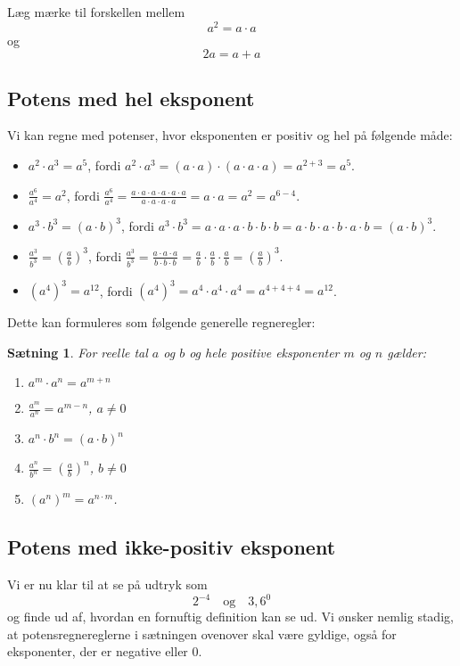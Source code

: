 \documentclass[12pt,oneside,a4paper]{article}
\theoremstyle{plain}
\newtheorem*{thm}{Sætning}
\begin{document}
Læg mærke til forskellen mellem
$$
a^2 = a \cdot a
$$
og
$$
2a = a + a
$$

\subsection*{Potens med hel eksponent}
Vi kan regne med potenser, hvor eksponenten er positiv og hel på følgende måde:
\begin{itemize}
    \item $a^2 \cdot a^3 = a^5$, fordi $a^2\cdot a^3 = (a\cdot a)\cdot (a \cdot
        a\cdot a) = a^{2+3} = a^5$.
    \item $\frac{a^6}{a^4} = a^2$, fordi $\frac{a^6}{a^4} = \frac{a \cdot a
        \cdot a\cdot a\cdot a\cdot a}{a\cdot a\cdot a\cdot a} = a\cdot a = a^2
        = a^{6-4}$.
    \item $a^3\cdot b^3 = (a\cdot b)^3$, fordi $a^3 \cdot b^3 = a\cdot a\cdot
        a\cdot b\cdot b\cdot b = a\cdot b\cdot a\cdot b\cdot a\cdot b = (a\cdot
        b)^3$.
    \item $\frac{a^3}{b^3} = \left(\frac{a}{b}\right)^3$, fordi
        $\frac{a^3}{b^3} = \frac{a\cdot a\cdot a}{b\cdot b\cdot b} =
        \frac{a}{b} \cdot \frac{a}{b} \cdot \frac{a}{b} =
        \left(\frac{a}{b}\right)^3$.
    \item $(a^4)^3 = a^{12}$, fordi $(a^4)^3 = a^4\cdot a^4 \cdot a^4 =
        a^{4+4+4} = a^{12}$.
\end{itemize}
Dette kan formuleres som følgende generelle regneregler:
\begin{thm}
    For reelle tal $a$ og $b$ og hele positive eksponenter $m$ og $n$ gælder:
    
    \begin{enumerate}
        \item $a^m \cdot a^n = a^{m+n}$
        \item $\frac{a^m}{a^n} = a^{m-n}$, \quad $a\neq 0$
        \item $a^n\cdot b^n = (a\cdot b)^n$
        \item $\frac{a^n}{b^n} = \left(\frac{a}{b}\right)^n$, \quad $b\neq 0$
        \item $(a^n)^m = a^{n\cdot m}$.
    \end{enumerate}
\end{thm}

\subsection*{Potens med ikke-positiv eksponent}
Vi er nu klar til at se på udtryk som 
$$
2^{-4}\quad \mbox{og} \quad 3,6^0
$$
og finde ud af, hvordan en fornuftig definition kan se ud. Vi ønsker nemlig
stadig, at potensregnereglerne i sætningen ovenover skal være gyldige, også
for eksponenter, der er negative eller 0.
\end{document}
